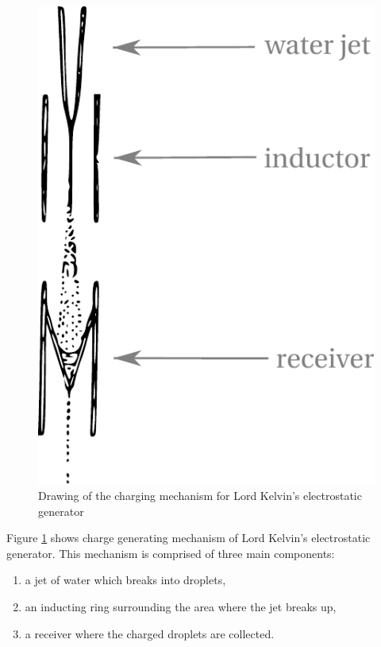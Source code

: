   \begin{figure}
      \centering
      \includegraphics[height=0.25\textheight]{content/appendices/chargedWaterDrops/graphics/Figure_Drawing_KelvinWaterDripper_ChargingMechanism}
      \caption{Drawing of the charging mechanism for Lord Kelvin's electrostatic
  generator}
      \label{Figure_Drawing_KelvinWaterDripper_ChargingMechanism}
  \end{figure}
  Figure \ref{Figure_Drawing_KelvinWaterDripper_ChargingMechanism} shows charge generating mechanism of Lord Kelvin's electrostatic generator.
  This mechanism is comprised of three main components:
  \begin{enumerate}
  \item a jet of water which breaks into droplets,
  \item an inducting ring surrounding the area where the jet breaks up,
  \item a receiver where the charged droplets are collected.
  \end{enumerate}
